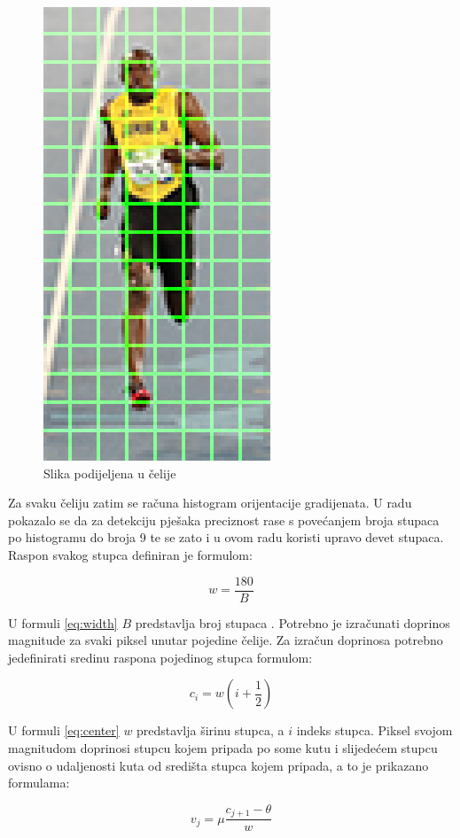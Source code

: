\documentclass[times, utf8, zavrsni]{fer}
\begin{document}
\begin{figure}[htb]
	\centering
	\includegraphics[width=0.3\linewidth]{figures/hog-cells.png}
	\caption{Slika podijeljena u čelije\protect\footnotemark}
	\label{fig:hogCells}
\end{figure}



Za svaku čeliju zatim se računa histogram orijentacije gradijenata. U radu \citep{dalal2005histograms} pokazalo se da za detekciju pješaka preciznost rase s povećanjem broja stupaca po histogramu do broja 9 te se zato i u ovom radu koristi upravo devet stupaca. Raspon svakog stupca definiran je formulom:

\begin{equation}
	w = \frac{180}{B}
	\label{eq:width}
\end{equation}

U formuli \ref{eq:width} \(B\) predstavlja broj stupaca \citep{tomasi2012histograms}. Potrebno je izračunati doprinos magnitude za svaki piksel unutar pojedine čelije. Za izračun doprinosa potrebno jedefinirati sredinu raspona pojedinog stupca formulom:

\begin{equation}
	c_i = w(i + \frac{1}{2})
	\label{eq:center}
\end{equation}

 U formuli \ref{eq:center} \(w\) predstavlja širinu stupca, a \(i\) indeks stupca. Piksel svojom magnitudom doprinosi stupcu kojem pripada po some kutu i slijedećem stupcu ovisno o udaljenosti kuta od središta stupca kojem pripada, a to je prikazano formulama: 
 
 \begin{equation}
	v_{j} = \mu \frac{c_{j + 1} - \theta}{w}
 	\label{eq:vote}
 \end{equation}
 
\end{document}
